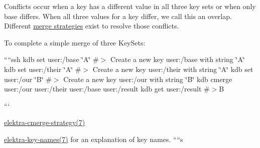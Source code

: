 Conflicts occur when a key has a different value in all three key sets or when only base differs. When all three values for a key differ, we call this an overlap. Different \hyperlink{doc_help_elektra-cmerge-strategy_md}{merge strategies} exist to resolve those conflicts.~\newline


To complete a simple merge of three Key\+Sets\+:~\newline


````ssh kdb set user\+:/base \char`\"{}\+A\char`\"{} \#$>$ Create a new key user\+:/base with string \char`\"{}\+A\char`\"{} kdb set user\+:/their \char`\"{}\+A\char`\"{} \#$>$ Create a new key user\+:/their with string \char`\"{}\+A\char`\"{} kdb set user\+:/our \char`\"{}\+B\char`\"{} \#$>$ Create a new key user\+:/our with string \char`\"{}\+B\char`\"{} kdb cmerge user\+:/our user\+:/their user\+:/base user\+:/result kdb get user\+:/result \#$>$B

```~\newline



\begin{DoxyItemize}
\item \hyperlink{doc_help_elektra-cmerge-strategy_md}{elektra-\/cmerge-\/strategy(7)}
\item \hyperlink{doc_help_elektra-key-names_md}{elektra-\/key-\/names(7)} for an explanation of key names. ````s 
\end{DoxyItemize}